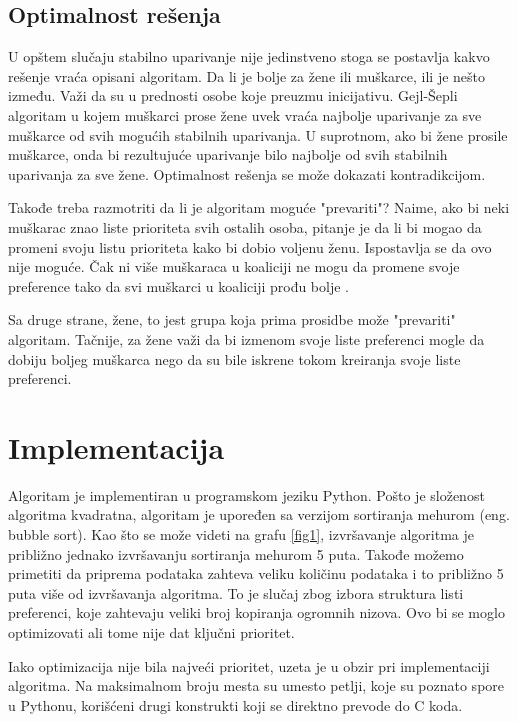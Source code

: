 \documentclass[a4paper]{article}
\begin{document}
\subsection{Optimalnost rešenja}
U opštem slučaju stabilno uparivanje nije jedinstveno stoga se postavlja kakvo rešenje vraća opisani algoritam. Da li je bolje za žene ili muškarce, ili je nešto između. Važi da su u prednosti osobe koje preuzmu inicijativu. Gejl-Šepli algoritam u kojem muškarci prose žene uvek vraća najbolje uparivanje za sve muškarce od svih mogućih stabilnih uparivanja. U suprotnom, ako bi žene prosile muškarce, onda bi rezultujuće uparivanje bilo najbolje od svih stabilnih uparivanja za sve žene. Optimalnost rešenja se može dokazati kontradikcijom.

Takođe treba razmotriti da li je algoritam moguće "prevariti"? Naime, ako bi neki muškarac znao liste prioriteta svih ostalih osoba, pitanje je da li bi mogao da promeni svoju listu prioriteta kako bi dobio voljenu ženu. Ispostavlja se da ovo nije moguće. Čak ni više muškaraca u koaliciji ne mogu da promene svoje preference tako da svi muškarci u koaliciji prođu bolje \cite{prevara}.

Sa druge strane, žene, to jest grupa koja prima prosidbe može "prevariti" algoritam. Tačnije, za žene važi da bi izmenom svoje liste preferenci mogle da dobiju boljeg muškarca nego da su bile iskrene tokom kreiranja svoje liste preferenci. 

\section{Implementacija}

Algoritam je implementiran u programskom jeziku Python. Pošto je složenost algoritma kvadratna, algoritam je upoređen sa verzijom sortiranja mehurom (eng. bubble sort). Kao što se može videti na grafu \ref{fig1}, izvršavanje algoritma je približno jednako izvršavanju sortiranja mehurom 5 puta. Takođe možemo primetiti da priprema podataka zahteva veliku količinu podataka i to približno 5 puta više od izvršavanja algoritma. To je slučaj zbog izbora struktura listi preferenci, koje zahtevaju veliki broj kopiranja ogromnih nizova. Ovo bi se moglo optimizovati ali tome nije dat ključni prioritet. 

Iako optimizacija nije bila najveći prioritet, uzeta je u obzir pri implementaciji algoritma. Na maksimalnom broju mesta su umesto petlji, koje su poznato spore u Pythonu, korišćeni drugi konstrukti koji se direktno prevode do C koda. 
\end{document}
